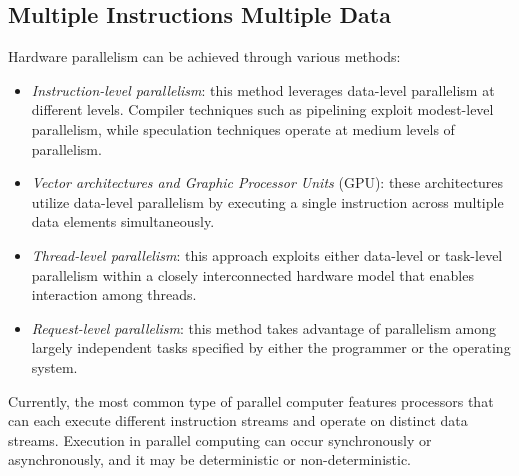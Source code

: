 \subsection{Multiple Instructions Multiple Data}
Hardware parallelism can be achieved through various methods:
\begin{itemize}
    \item \textit{Instruction-level parallelism}: this method leverages data-level parallelism at different levels. 
        Compiler techniques such as pipelining exploit modest-level parallelism, while speculation techniques operate at medium levels of parallelism.
    \item \textit{Vector architectures and Graphic Processor Units} (GPU): these architectures utilize data-level parallelism by executing a single instruction across multiple data elements simultaneously.
    \item \textit{Thread-level parallelism}: this approach exploits either data-level or task-level parallelism within a closely interconnected hardware model that enables interaction among threads.
    \item \textit{Request-level parallelism}: this method takes advantage of parallelism among largely independent tasks specified by either the programmer or the operating system.
\end{itemize}
Currently, the most common type of parallel computer features processors that can each execute different instruction streams and operate on distinct data streams. 
Execution in parallel computing can occur synchronously or asynchronously, and it may be deterministic or non-deterministic.

